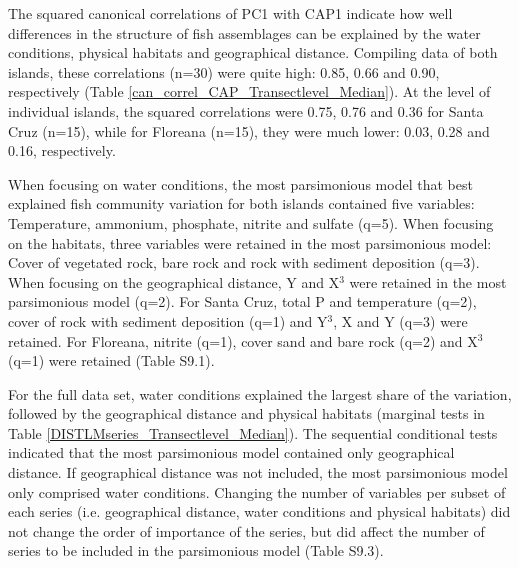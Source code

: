 \FloatBarrier

The squared canonical correlations of PC1 with CAP1 indicate how well differences in the structure of fish assemblages can be explained by the water conditions, physical habitats and geographical distance. Compiling data of both islands, these correlations (n=30) were quite high: 0.85, 0.66 and 0.90, respectively (Table \ref{can_correl_CAP_Transectlevel_Median}). At the level of individual islands, the squared correlations were 0.75, 0.76 and 0.36 for Santa Cruz (n=15), while for Floreana (n=15), they were much lower: 0.03, 0.28 and 0.16, respectively. 

When focusing on water conditions, the most parsimonious model that best explained fish community variation for both islands contained five variables: Temperature, ammonium, phosphate, nitrite and sulfate (q=5). When focusing on the habitats, three variables were retained in the most parsimonious model: Cover of vegetated rock, bare rock and rock with sediment deposition (q=3). When focusing on the geographical distance, Y and X$^{3}$ were retained in the most parsimonious model (q=2). For Santa Cruz, total P and temperature (q=2), cover of rock with sediment deposition (q=1) and Y$^{3}$, X and Y (q=3) were retained. For Floreana, nitrite (q=1), cover sand and bare rock (q=2) and X$^{3}$ (q=1) were retained (Table S9.1).  

For the full data set, water conditions explained the largest share of the variation, followed by the geographical distance and physical habitats (marginal tests in Table \ref{DISTLMseries_Transectlevel_Median}). The sequential conditional tests indicated that the most parsimonious model contained only geographical distance. If geographical distance was not included, the most parsimonious model only comprised water conditions. Changing the number of variables per subset of each series (i.e. geographical distance, water conditions and physical habitats) did not change the order of importance of the series, but did affect the number of series to be included in the parsimonious model (Table S9.3).

